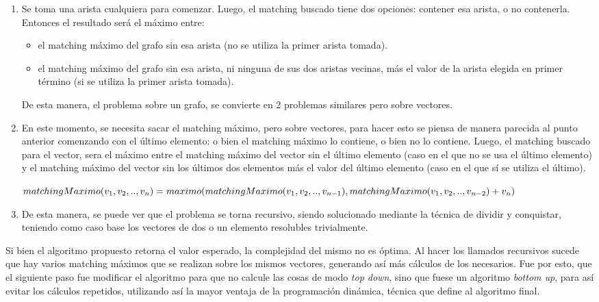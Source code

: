 \documentclass[a4paper, 12pt]{article}
\begin{document}
\begin{enumerate}
\item Se toma una arista cualquiera para comenzar. Luego, el matching buscado tiene dos opciones: contener esa arista, o no contenerla. Entonces el resultado será el máximo entre:
\begin{itemize}
 \item el matching máximo del grafo sin esa arista (no se utiliza la primer arista tomada).
 \item el matching máximo del grafo sin esa arista, ni ninguna de sus dos aristas vecinas, más el valor de la arista elegida en primer término (si se utiliza la primer arista tomada).
\end{itemize}
  De esta manera, el problema sobre un grafo, se convierte en 2 problemas similares pero sobre vectores.
\item En este momento, se necesita sacar el matching máximo, pero sobre vectores, para hacer esto se piensa de manera parecida al punto anterior comenzando con el último elemento: o bien el matching máximo lo contiene, o bien no lo contiene. Luego, el matching buscado para el vector, sera el máximo entre el matching máximo del vector sin el último elemento (caso en el que no se usa el último elemento) y el matching máximo del vector sin los últimos dos elementos más el valor del último elemento (caso en el que sí se utiliza el último).

	$matchingMaximo(v_1,v_2,..,v_n) = \\ maximo(matchingMaximo(v_1,v_2,..,v_{n-1}), \\ matchingMaximo(v_1,v_2,..,v_{n-2}) + v_n)$
\item De esta manera, se puede ver que el problema se torna recursivo, siendo solucionado mediante la técnica de dividir y conquistar, teniendo como caso base los vectores de dos o un elemento resolubles trivialmente.
\end{enumerate}

Si bien el algoritmo propuesto retorna el valor esperado, la complejidad del mismo no es óptima. Al hacer los llamados recursivos sucede que hay varios matching máximos que se realizan sobre los mismos vectores, generando así más cálculos de los necesarios. Fue por esto, que el siguiente paso fue modificar el algoritmo para que no calcule las cosas de modo \emph{top down}, sino que fuese un algoritmo \emph{bottom up}, para así evitar los cálculos repetidos, utilizando así la mayor ventaja de la programación dinámica, técnica que define al algoritmo final.
\end{document}
